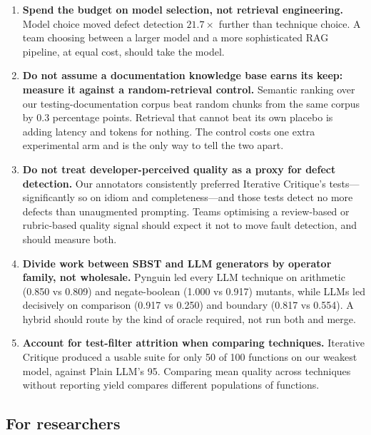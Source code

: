 \documentclass[smallextended]{svjour3}
\begin{document}
\begin{enumerate}
\item \textbf{Spend the budget on model selection, not retrieval
 engineering.} Model choice moved defect detection $21.7\times$
 further than technique choice. A team choosing between a larger model
 and a more sophisticated RAG pipeline, at equal cost, should take
 the model.
\item \textbf{Do not assume a documentation knowledge base earns its
 keep: measure it against a random-retrieval control.} Semantic
 ranking over our testing-documentation corpus beat random chunks
 from the same corpus by 0.3 percentage points. Retrieval that
 cannot beat its own placebo is adding latency and tokens for
 nothing. The control costs one extra experimental arm and is the
 only way to tell the two apart.
\item \textbf{Do not treat developer-perceived quality as a proxy for
 defect detection.} Our annotators consistently preferred Iterative
 Critique's tests---significantly so on idiom and completeness---and
 those tests detect no more defects than unaugmented prompting.
 Teams optimising a review-based or rubric-based quality signal
 should expect it not to move fault detection, and should measure
 both.
\item \textbf{Divide work between SBST and LLM generators by operator
 family, not wholesale.} Pynguin led every LLM technique on arithmetic
 (0.850 vs 0.809) and negate-boolean (1.000 vs 0.917) mutants, while
 LLMs led decisively on comparison (0.917 vs 0.250) and boundary
 (0.817 vs 0.554). A hybrid should route by the kind of oracle
 required, not run both and merge.
\item \textbf{Account for test-filter attrition when comparing
 techniques.} Iterative Critique produced a usable suite for only 50 of
 100 functions on our weakest model, against Plain LLM's 95.
 Comparing mean quality across techniques without reporting yield
 compares different populations of functions.
\end{enumerate}

\subsection{For researchers}\label{sec:implications-research}
\end{document}
